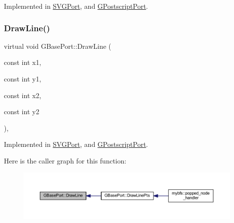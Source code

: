 Implemented in \mbox{\hyperlink{class_s_v_g_port_a9aba350c03b01d93168882746b18ec07}{S\+V\+G\+Port}}, and \mbox{\hyperlink{class_g_postscript_port_a859f59aeb691f0a9072aacc555417bb5}{G\+Postscript\+Port}}.

\mbox{\label{class_g_base_port_a9e19a5d97e629c3d19be31e1938504c1}} 
\subsubsection{\texorpdfstring{Draw\+Line()}{DrawLine()}}
{\footnotesize\ttfamily virtual void G\+Base\+Port\+::\+Draw\+Line (\begin{DoxyParamCaption}\item[{const int}]{x1,  }\item[{const int}]{y1,  }\item[{const int}]{x2,  }\item[{const int}]{y2 }\end{DoxyParamCaption})\hspace{0.3cm}{\ttfamily [pure virtual]}, {\ttfamily [inherited]}}



Implemented in \mbox{\hyperlink{class_s_v_g_port_ab51984003b6e8f6170ef3fe4ba09b030}{S\+V\+G\+Port}}, and \mbox{\hyperlink{class_g_postscript_port_a5f148a471c23fbf49397e17947c426e2}{G\+Postscript\+Port}}.

Here is the caller graph for this function\+:
\nopagebreak
\begin{figure}[H]
\begin{center}
\leavevmode
\includegraphics[width=350pt]{class_g_base_port_a9e19a5d97e629c3d19be31e1938504c1_icgraph}
\end{center}
\end{figure}
\mbox{\label{class_g_base_port_ad176b1ff88c4c0a29d51869b13a288d2}} 
